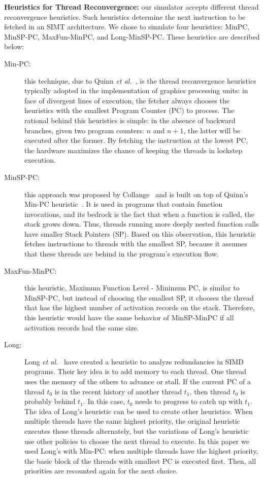 \documentclass[times,10pt,twocolumn]{article}
\begin{document}
\noindent
\textbf{Heuristics for Thread Reconvergence:}
our simulator accepts different thread reconvergence heuristics.
Such heuristics determine the next instruction to be fetched in an SIMT
architecture.
We chose to simulate four heuristics: MinPC, MinSP-PC, MaxFun-MinPC, and
Long-MinSP-PC.
These heuristics are described below:
\begin{small}
\begin{description}
\item [Min-PC:] this technique, due to Quinn {\em et al.}~\cite{Quinn88}, is the
thread reconvergence heuristics typically adopted
in the implementation of graphics processing units: in face of divergent
lines of execution, the fetcher always chooses the heuristics with the smallest
Program Counter (PC) to process.
The rational behind this heuristics is simple: in the absence of backward
branches, given two program counters: $n$ and $n+1$, the latter will be executed
after the former.
By fetching the instruction at the lowest PC, the hardware maximizes the chance
of keeping the threads in lockstep execution.

\item [MinSP-PC:] this approach was proposed by Collange~\cite{Collange11} and is 
built on top of Quinn's Min-PC heuristic~\cite{Quinn88}.
It is used in programs that contain function invocations, and its bedrock is 
the fact that when a function is called, the stack grows down.
Thus, threads running more deeply nested function calls have smaller Stack
Pointers (SP).
Based on this observation, this heuristic fetches instructions to threads with the
smallest SP, because it assumes that these threads are behind in the program's 
execution flow.

\item [MaxFun-MinPC:] this heuristic, Maximum Function Level - Minimum PC,
is similar to MinSP-PC, but instead of choosing the smallest SP, it chooses the
thread that has the highest number of activation records on the stack.
Therefore, this heuristic would have the same behavior of MinSP-MinPC if all
activation records had the same size. 

\item [Long:] Long {\em et al.}~\cite{Long10} have created a heuristic to analyze
redundancies in SIMD programs.
Their key idea is to add memory to each thread.
One thread uses the memory of the others to advance or stall.
If the current PC of a thread $t_{0}$ is in the recent history of another
thread $t_{1}$, then thread $t_{0}$ is probably behind $t_{1}$.
In this case, $t_{0}$ needs to progress to catch up with $t_{1}$.
The idea of Long’s heuristic can be used to create other heuristics.
When multiple threads have the same highest priority, the original heuristic
executes these threads alternately, but the variations of Long's heuristic use
other policies to choose the next thread to execute.
In this paper we used Long's with Min-PC: when multiple threads have the
highest priority, the basic block of the threads with smallest PC is executed
first.
Then, all priorities are recounted again for the next choice.
\end{description}
\end{small}
\end{document}
